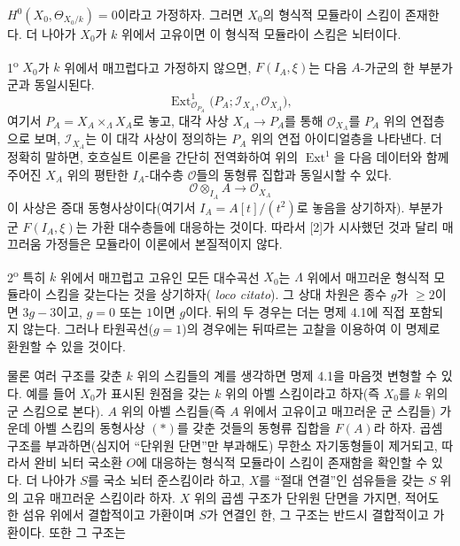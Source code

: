  $H^0(X_0,\Theta_{X_0/k})=0$이라고 가정하자. 그러면
$X_0$의 형식적 모듈라이 스킴이 존재한다. 더 나아가 $X_0$가 $k$ 위에서
고유이면 이 형식적 모듈라이 스킴은 뇌터이다.

 1\textsuperscript{o} $X_0$가 $k$ 위에서 매끄럽다고
가정하지 않으면, $F(I_A,\xi)$는 다음 $A$-가군의 한 부분가군과 동일시된다.
\[
  \operatorname{Ext}^1_{\mathcal O_{P_A}}
  \bigl(P_A;\mathcal I_{X_A},\mathcal O_{X_A}\bigr),
\]
여기서 $P_A=X_A\times_\Lambda X_A$로 놓고, 대각 사상
$X_A\longrightarrow P_A$를 통해 $\mathcal O_{X_A}$를 $P_A$ 위의
연접층으로 보며, $\mathcal I_{X_A}$는 이 대각 사상이 정의하는 $P_A$
위의 연접 아이디얼층을 나타낸다. 더 정확히 말하면, 호흐실트 이론을
간단히 전역화하여 위의 $\operatorname{Ext}^1$을 다음 데이터와 함께 주어진
$X_A$ 위의 평탄한 $I_A$-대수층 $\mathcal O$들의 동형류 집합과 동일시할
수 있다.
\[
  \mathcal O\otimes_{I_A}A\longrightarrow\mathcal O_{X_A}
\]
이 사상은 증대 동형사상이다(여기서 $I_A=A[t]/(t^2)$로 놓음을 상기하자).
부분가군 $F(I_A,\xi)$는 가환 대수층들에 대응하는 것이다. 따라서 [2]가
시사했던 것과 달리 매끄러움 가정들은 모듈라이 이론에서 본질적이지 않다.

2\textsuperscript{o} 특히 $k$ 위에서 매끄럽고 고유인 모든 대수곡선
$X_0$는 $\Lambda$ 위에서 매끄러운 형식적 모듈라이 스킴을 갖는다는 것을
상기하자(
\textit{loco citato}). 그 상대 차원은 종수 $g$가 $\geq2$이면 $3g-3$이고,
$g=0$ 또는 $1$이면 $g$이다. 뒤의 두 경우는 더는 명제 4.1에 직접
포함되지 않는다. 그러나 타원곡선($g=1$)의 경우에는 뒤따르는 고찰을
이용하여 이 명제로 환원할 수 있을 것이다.

물론 여러 구조를 갖춘 $k$ 위의 스킴들의 계를 생각하면 명제 4.1을 마음껏
변형할 수 있다. 예를 들어 $X_0$가 표시된 원점을 갖는 $k$ 위의 아벨
스킴이라고 하자(즉 $X_0$를 $k$ 위의 군 스킴으로 본다). $A$ 위의 아벨
스킴들(즉 $A$ 위에서 고유이고 매끄러운 군 스킴들) 가운데 아벨 스킴의
동형사상 $(*)$를 갖춘 것들의 동형류 집합을 $F(A)$라 하자. 곱셈 구조를
부과하면(심지어 ``단위원 단면''만 부과해도) 무한소 자기동형들이 제거되고,
따라서 완비 뇌터 국소환 $O$에 대응하는 형식적 모듈라이 스킴이 존재함을
확인할 수 있다. 더 나아가 $S$를 국소 뇌터 준스킴이라 하고, $X$를
``절대 연결''인 섬유들을 갖는 $S$ 위의 고유 매끄러운 스킴이라 하자.
$X$ 위의 곱셈 구조가 단위원 단면을 가지면, 적어도 한 섬유 위에서 결합적이고
가환이며 $S$가 연결인 한, 그 구조는 반드시 결합적이고 가환이다. 또한 그
구조는

